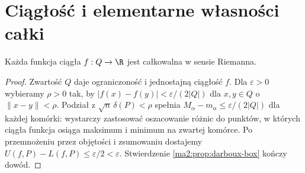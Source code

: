 \section{Ciągłość i elementarne własności całki}

\begin{twierdzenie}
\label{ma2:thm:riemann-box-continuous}
Każda funkcja ciągła $f:Q\to\R$ jest
całkowalna w sensie Riemanna.
\end{twierdzenie}
\begin{proof}
Zwartość $Q$ daje ograniczoność i jednostajną
ciągłość $f$. Dla $\varepsilon>0$ wybieramy
$\rho>0$ tak, by
$|f(x)-f(y)|<\varepsilon/(2|Q|)$ dla
$x,y\in Q$ o $\|x-y\|<\rho$.
Podział z $\sqrt n\,\delta(P)<\rho$ spełnia
$M_\alpha-m_\alpha\le\varepsilon/(2|Q|)$
dla każdej komórki: wystarczy zastosować
oszacowanie różnic do punktów, w których
ciągła funkcja osiąga maksimum i minimum
na zwartej komórce. Po przemnożeniu przez
objętości i zsumowaniu dostajemy
$U(f,P)-L(f,P)\le\varepsilon/2<\varepsilon$.
Stwierdzenie \ref{ma2:prop:darboux-box} kończy dowód.
\end{proof}

